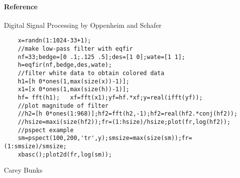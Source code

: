\paragraph{Reference}
Digital Signal Processing by Oppenheim and Schafer
\begin{examples}
  \begin{Verbatim}
    x=randn(1:1024-33+1);
    //make low-pass filter with eqfir
    nf=33;bedge=[0 .1;.125 .5];des=[1 0];wate=[1 1];
    h=eqfir(nf,bedge,des,wate);
    //filter white data to obtain colored data 
    h1=[h 0*ones(1,max(size(x))-1)];
    x1=[x 0*ones(1,max(size(h))-1)];
    hf= fft(h1);   xf=fft(x1);yf=hf.*xf;y=real(ifft(yf));
    //plot magnitude of filter
    //h2=[h 0*ones(1:968)];hf2=fft(h2,-1);hf2=real(hf2.*conj(hf2));
    //hsize=maxi(size(hf2));fr=(1:hsize)/hsize;plot(fr,log(hf2));
    //pspect example
    sm=pspect(100,200,'tr',y);smsize=max(size(sm));fr=(1:smsize)/smsize;
    xbasc();plot2d(fr,log(sm));
  \end{Verbatim}
\end{examples}
\begin{manseealso}
\end{manseealso}
\begin{authors}
  Carey Bunks
\end{authors}
